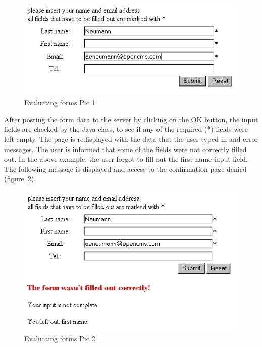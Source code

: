 \begin{figure}
\begin{center}
\includegraphics[clip,width=0.7\linewidth]{pics/modules/41}
\end{center}
\caption[Evaluating forms Pic 1]{Evaluating forms Pic 1.}
\label{EvaluForms}
\end{figure}

After posting the form data to the server by clicking on the OK button,
the input fields are checked by the Java class, to see if any of the
required (*) fields were left empty. The page is redisplayed with the
data that the user typed in and error messages. The user is informed
that  some of the fields were not correctly filled out. In the above
example, the user forgot to fill out the first name input field. The
following message is displayed and access to the confirmation page denied
(figure~\ref{EvaluForms1}).

\begin{figure}
\begin{center}
\includegraphics[clip,width=0.7\linewidth]{pics/modules/42}
\end{center}
\caption[Evaluating forms Pic 2]{Evaluating forms Pic 2.}
\label{EvaluForms1}
\end{figure}

